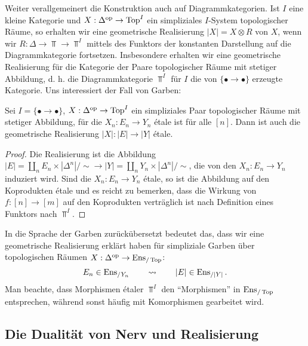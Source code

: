 Weiter verallgemeinert die Konstruktion auch auf
Diagrammkategorien. Ist $I$ eine kleine Kategorie und $X: \Delta^\mathrm{op}
\to \operatorname{Top}^I$ ein simpliziales $I$-System topologischer Räume, so
erhalten wir eine geometrische Realisierung $|X| = X \otimes R$ von
$X$, wenn wir $R: \Delta \to \Top \to \Top^I$ mittels des Funktors der
konstanten Darstellung auf die Diagrammkategorie
fortsetzen. Insbesondere erhalten wir eine geometrische Realisierung
für die Kategorie der Paare topologischer Räume mit stetiger
Abbildung, d. h. die Diagrammkategorie $\Top^I$ für $I$ die von
$\{ \bullet \to \bullet \}$ erzeugte Kategorie. Uns interessiert der
Fall von Garben:
\begin{satz} \label{real-enstop}
  Sei $I = \{ \bullet \to \bullet \}$, $X: \Delta^\mathrm{op} \to \operatorname{Top}^I$ ein
  simpliziales Paar topologischer Räume mit stetiger Abbildung, für
  die $X_n: E_n \to Y_n$ étale ist für alle $[n]$. Dann ist auch die
  geometrische Realisierung $|X|: |E| \to |Y|$ étale.
\end{satz}
\begin{proof}
  Die Realisierung ist die Abbildung $|E| = \coprod_n E_n \times
  |\Delta^n| / \sim \to |Y| = \coprod_n Y_n \times |\Delta^n| / \sim$,
  die von den $X_n: E_n \to Y_n$ induziert wird. Sind die $X_n: E_n
  \to Y_n$ étale, so ist die Abbildung auf den Koprodukten étale und
  es reicht zu bemerken, dass die Wirkung von $f: [n] \to [m]$ auf den
  Koprodukten verträglich ist nach Definition eines Funktors nach
  $\Top^I$.
\end{proof}
In die Sprache der Garben zurückübersetzt bedeutet das, dass wir eine
geometrische Realisierung erklärt haben für simpliziale Garben über
topologischen Räumen $X: \Delta^\mathrm{op} \to \operatorname{Ens}_{/\operatorname{Top}}$:
\[ E_n \in \operatorname{Ens}_{/Y_n} \qquad \rightsquigarrow \qquad |E| \in \operatorname{Ens}_{/|Y|} . \]
Man beachte, dass Morphismen étaler $\Top^I$ den ``Morphismen'' in
$\operatorname{Ens}_{/\operatorname{Top}}$ entsprechen, während sonst häufig mit Komorphismen
gearbeitet wird.

\subsection{Die Dualität von Nerv und Realisierung}

